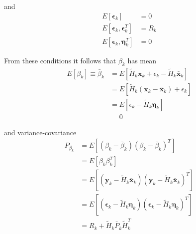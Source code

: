 and
\begin{equation}
	\begin{aligned}
		E \left[ \bm{\epsilon}_k \right]                     & = 0   \\
		E \left[ \bm{\epsilon}_k , \bm{\epsilon}^T_k \right] & = R_k \\
		E \left[ \bm{\epsilon}_k , \bm{\eta}^T_k \right]     & = 0
	\end{aligned}
\end{equation}

From these conditions it follows that \(\beta _k\) has mean
\begin{equation}
	\begin{aligned}
		E \left[ \beta _k \right] \equiv \bar{\beta}_k & = E \left[
		\tilde{H}_k \bm{x}_k + \epsilon _k - \tilde{H}_k \bar{\bm{x}}_k \right]                                                                \\
		                                               & = E \left[ \tilde{H}_k \left( \bm{x}_k - \bar{\bm{x}}_k \right) + \epsilon _k \right] \\
		                                               & = E \left[ \epsilon _k - \tilde{H}_k \bm{\eta}_k \right]                              \\
		                                               & = 0
	\end{aligned}
\end{equation}

and variance-covariance
\begin{equation}
	\begin{aligned}
		P_{\beta _k} & =
		E \left[ \left( \beta _k - \bar{\beta}_k \right) \left( \beta _k - \bar{\beta}_k \right)^T \right] \\
		             & = E \left[ \beta _k {\beta}^T_k \right]                                             \\
		             & = E \left[ \left( \bm{y}_k - \tilde{H}_k \bar{\bm{x}}_k \right)
		\left( \bm{y}_k - \tilde{H}_k \bar{\bm{x}}_k \right)^T \right]                                     \\
		             & = E \left[ \left( \bm{\epsilon}_k - \tilde{H}_k \bm{\eta}_k \right)
		\left( \bm{\epsilon}_k - \tilde{H}_k \bm{\eta}_k \right)^T \right]                                 \\
		             & = R_k + \tilde{H}_k \bar{P}_k \tilde{H}^T_k
	\end{aligned}
\end{equation}

